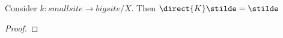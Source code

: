 \begin{lemma}
Consider $k: smallsite \rightarrow bigsite/X$.
Then $\direct{K}\stilde = \stilde$
\end{lemma}
\begin{proof}
\end{proof}

